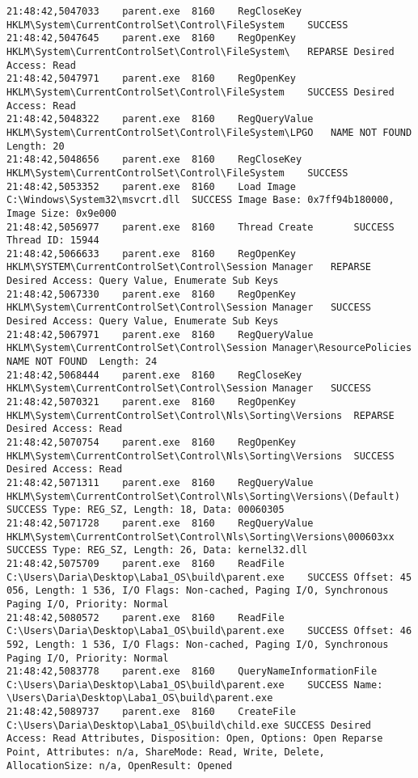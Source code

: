 \begin{verbatim}
21:48:42,5047033	parent.exe	8160	RegCloseKey	HKLM\System\CurrentControlSet\Control\FileSystem	SUCCESS	
21:48:42,5047645	parent.exe	8160	RegOpenKey	HKLM\System\CurrentControlSet\Control\FileSystem\	REPARSE	Desired Access: Read
21:48:42,5047971	parent.exe	8160	RegOpenKey	HKLM\System\CurrentControlSet\Control\FileSystem	SUCCESS	Desired Access: Read
21:48:42,5048322	parent.exe	8160	RegQueryValue	HKLM\System\CurrentControlSet\Control\FileSystem\LPGO	NAME NOT FOUND	Length: 20
21:48:42,5048656	parent.exe	8160	RegCloseKey	HKLM\System\CurrentControlSet\Control\FileSystem	SUCCESS	
21:48:42,5053352	parent.exe	8160	Load Image	C:\Windows\System32\msvcrt.dll	SUCCESS	Image Base: 0x7ff94b180000, Image Size: 0x9e000
21:48:42,5056977	parent.exe	8160	Thread Create		SUCCESS	Thread ID: 15944
21:48:42,5066633	parent.exe	8160	RegOpenKey	HKLM\SYSTEM\CurrentControlSet\Control\Session Manager	REPARSE	Desired Access: Query Value, Enumerate Sub Keys
21:48:42,5067330	parent.exe	8160	RegOpenKey	HKLM\System\CurrentControlSet\Control\Session Manager	SUCCESS	Desired Access: Query Value, Enumerate Sub Keys
21:48:42,5067971	parent.exe	8160	RegQueryValue	HKLM\System\CurrentControlSet\Control\Session Manager\ResourcePolicies	NAME NOT FOUND	Length: 24
21:48:42,5068444	parent.exe	8160	RegCloseKey	HKLM\System\CurrentControlSet\Control\Session Manager	SUCCESS	
21:48:42,5070321	parent.exe	8160	RegOpenKey	HKLM\System\CurrentControlSet\Control\Nls\Sorting\Versions	REPARSE	Desired Access: Read
21:48:42,5070754	parent.exe	8160	RegOpenKey	HKLM\System\CurrentControlSet\Control\Nls\Sorting\Versions	SUCCESS	Desired Access: Read
21:48:42,5071311	parent.exe	8160	RegQueryValue	HKLM\System\CurrentControlSet\Control\Nls\Sorting\Versions\(Default)	SUCCESS	Type: REG_SZ, Length: 18, Data: 00060305
21:48:42,5071728	parent.exe	8160	RegQueryValue	HKLM\System\CurrentControlSet\Control\Nls\Sorting\Versions\000603xx	SUCCESS	Type: REG_SZ, Length: 26, Data: kernel32.dll
21:48:42,5075709	parent.exe	8160	ReadFile	C:\Users\Daria\Desktop\Laba1_OS\build\parent.exe	SUCCESS	Offset: 45 056, Length: 1 536, I/O Flags: Non-cached, Paging I/O, Synchronous Paging I/O, Priority: Normal
21:48:42,5080572	parent.exe	8160	ReadFile	C:\Users\Daria\Desktop\Laba1_OS\build\parent.exe	SUCCESS	Offset: 46 592, Length: 1 536, I/O Flags: Non-cached, Paging I/O, Synchronous Paging I/O, Priority: Normal
21:48:42,5083778	parent.exe	8160	QueryNameInformationFile	C:\Users\Daria\Desktop\Laba1_OS\build\parent.exe	SUCCESS	Name: \Users\Daria\Desktop\Laba1_OS\build\parent.exe
21:48:42,5089737	parent.exe	8160	CreateFile	C:\Users\Daria\Desktop\Laba1_OS\build\child.exe	SUCCESS	Desired Access: Read Attributes, Disposition: Open, Options: Open Reparse Point, Attributes: n/a, ShareMode: Read, Write, Delete, AllocationSize: n/a, OpenResult: Opened

\end{verbatim}
